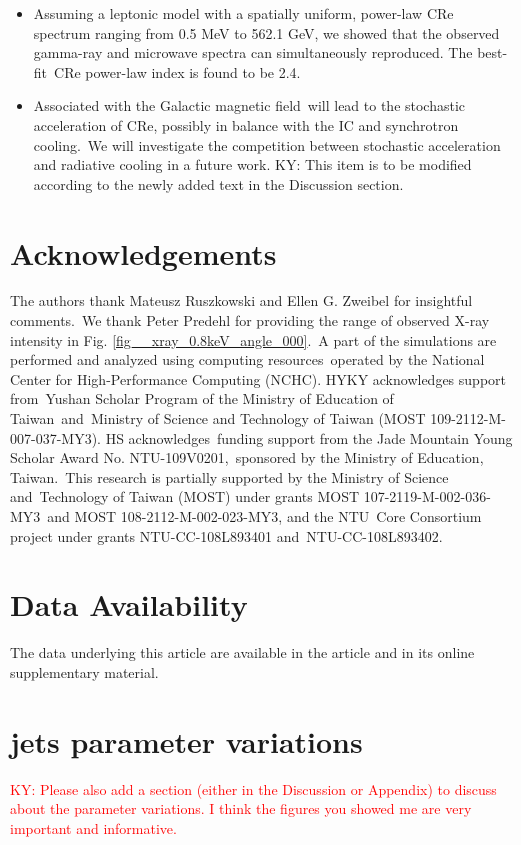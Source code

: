 \documentclass[fleqn,usenatbib,useAMS]{mnras}
\begin{document}
\begin{itemize}
\item Assuming a leptonic model with a spatially uniform, power-law CRe spectrum ranging from 0.5 MeV to 562.1 GeV, we showed that the observed gamma-ray and microwave spectra can simultaneously reproduced. The best-fit\
      CRe power-law index is found to be 2.4.
\item Associated with the Galactic magnetic field\
      will lead to the stochastic acceleration of CRe, possibly in balance with the IC and synchrotron cooling.\
      We will investigate the competition between stochastic acceleration and radiative cooling in a future work. {\color{red} KY: This item is to be modified according to the newly added text in the Discussion section.}
\end{itemize}



\section{Acknowledgements}
The authors thank Mateusz Ruszkowski and Ellen G. Zweibel for insightful comments.\
We thank Peter Predehl for providing the range of observed X-ray intensity in Fig. \ref{fig__xray_0.8keV_angle_000}.\
A part of the simulations are performed and analyzed using computing resources\
operated by the National Center for High-Performance Computing (NCHC).
HYKY acknowledges support from\
Yushan Scholar Program of the Ministry of Education of Taiwan\
and\
Ministry of Science and Technology of Taiwan (MOST 109-2112-M-007-037-MY3).
HS acknowledges\
funding support from the Jade Mountain Young Scholar Award No. NTU-109V0201,\
sponsored by the Ministry of Education, Taiwan.\
This research is partially supported by the Ministry of Science and\
Technology of Taiwan (MOST) under grants MOST 107-2119-M-002-036-MY3\
and MOST 108-2112-M-002-023-MY3, and the NTU\
Core Consortium project under grants NTU-CC-108L893401 and\
NTU-CC-108L893402.

\section*{Data Availability}
The data underlying this article are available in the article and in its online supplementary material.






\appendix
\section{jets parameter variations}
\textcolor{red}{KY: Please also add a section (either in the Discussion
or Appendix) to discuss about the parameter variations.
I think the figures you showed me are very important
and informative.}



\end{document}
